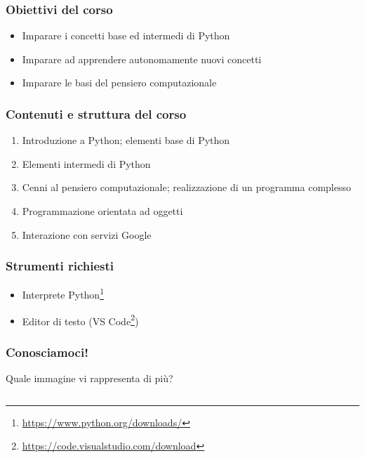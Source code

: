
\begin{contentframe}
    \frametitle{Obiettivi del corso}

    \begin{itemize}
        \item Imparare i concetti base ed intermedi di Python
        
        \bigskip
        \item Imparare ad apprendere autonomamente nuovi concetti

        \bigskip
        \item Imparare le basi del pensiero computazionale
    \end{itemize}
\end{contentframe}

\begin{contentframe}
    \frametitle{Contenuti e struttura del corso}

    \begin{enumerate}
        \item Introduzione a Python; elementi base di Python
        \item Elementi intermedi di Python
        \item Cenni al pensiero computazionale; realizzazione di un programma complesso
        \item Programmazione orientata ad oggetti
        \item Interazione con servizi Google
    \end{enumerate}
\end{contentframe}

\begin{contentframe}
    \frametitle{Strumenti richiesti}

    \begin{itemize}    
        \item Interprete Python\footnote[frame]{\url{https://www.python.org/downloads/}}
        \item Editor di testo (VS Code\footnote[frame]{\url{https://code.visualstudio.com/download}})
    \end{itemize}
\end{contentframe}

\begin{contentframe}
    \frametitle{Conosciamoci!}
    
    Quale immagine vi rappresenta di più?

    \bigskip
    \begin{columns}
        \centering
        
        \centering
        
        \centering
    \end{columns}
\end{contentframe}

